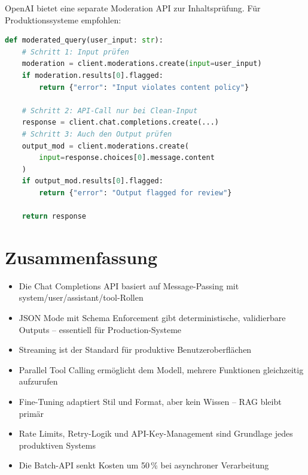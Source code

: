 OpenAI bietet eine separate Moderation API zur Inhaltsprüfung. Für Produktionssysteme empfohlen:

\begin{lstlisting}[language=Python, caption={Content-Moderation vor dem API-Call}, label=lst:moderation]
def moderated_query(user_input: str):
    # Schritt 1: Input prüfen
    moderation = client.moderations.create(input=user_input)
    if moderation.results[0].flagged:
        return {"error": "Input violates content policy"}

    # Schritt 2: API-Call nur bei Clean-Input
    response = client.chat.completions.create(...)
    # Schritt 3: Auch den Output prüfen
    output_mod = client.moderations.create(
        input=response.choices[0].message.content
    )
    if output_mod.results[0].flagged:
        return {"error": "Output flagged for review"}

    return response
\end{lstlisting}

\section{Zusammenfassung}

\begin{itemize}[leftmargin=*]
    \item Die Chat Completions API basiert auf Message-Passing mit system/user/assistant/tool-Rollen
    \item JSON Mode mit Schema Enforcement gibt deterministische, validierbare Outputs -- essentiell für Production-Systeme
    \item Streaming ist der Standard für produktive Benutzeroberflächen
    \item Parallel Tool Calling ermöglicht dem Modell, mehrere Funktionen gleichzeitig aufzurufen
    \item Fine-Tuning adaptiert Stil und Format, aber kein Wissen -- RAG bleibt primär
    \item Rate Limits, Retry-Logik und API-Key-Management sind Grundlage jedes produktiven Systems
    \item Die Batch-API senkt Kosten um 50\,\% bei asynchroner Verarbeitung
\end{itemize}

